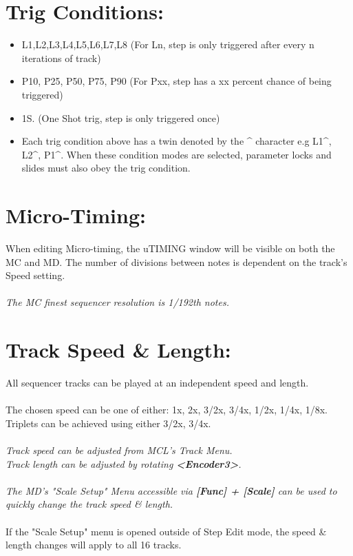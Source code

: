 \section{Trig Conditions:}
\begin{itemize}
\item L1,L2,L3,L4,L5,L6,L7,L8 (For Ln, step is only triggered after every n iterations of track)
\item P10, P25, P50, P75, P90 (For Pxx, step has a xx percent chance of being triggered)
\item 1S. (One Shot trig, step is only triggered once)
\item Each trig condition above has a twin denoted by the \^{} character e.g L1\^{}, L2\^{}, P1\^{}. When these condition modes are selected, parameter locks and slides must also obey the trig condition.
\end{itemize}
\section{Micro-Timing:}
When editing Micro-timing, the uTIMING window will be visible on both the MC and MD. The number of divisions between notes is dependent on the track's Speed setting.\\\\\textit{The MC finest sequencer resolution is 1/192th notes.}
\section{Track Speed \& Length:}
All sequencer tracks can be played at an independent speed and length.\\\\
The chosen speed can be one of either: 1x, 2x, 3/2x, 3/4x, 1/2x, 1/4x, 1/8x.\\Triplets can be achieved using either 3/2x, 3/4x.\\\\
\textit{Track speed can be adjusted from MCL's Track Menu.\\Track length can be adjusted by rotating \textbf{<Encoder3>}.\\\\The MD's "Scale Setup" Menu accessible via \textbf{[Func] + [Scale]} can be used to quickly change the track speed \& length.}
\\\\If the "Scale Setup" menu is opened outside of Step Edit mode, the speed \& length changes will apply to all 16 tracks.
